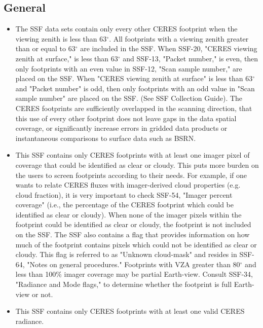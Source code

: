 \documentclass[12pt]{article}
\begin{document}
\subsection{General}\label{general}
\begin{itemize}
	\item The SSF data sets contain only every other CERES footprint when the viewing zenith is 		less than 63$^{\circ}$. All footprints with a viewing zenith greater than or equal to 63$^{\circ}$ 		are included in the SSF. When SSF-20, "CERES viewing zenith at surface," is less than 			63$^{\circ}$ and SSF-13, "Packet number," is even, then only footprints with an even value in 		SSF-12, "Scan sample number," are placed on the SSF. When "CERES viewing zenith at 			surface" is less than 63$^{\circ}$ and "Packet number" is odd, then only footprints with an odd 		value in "Scan sample number" are placed on the SSF. (See SSF Collection Guide). The 			CERES footprints are sufficiently overlapped in the scanning direction, that this use of every 		other footprint does not leave gaps in the data spatial coverage, or significantly increase errors 		in gridded data products or instantaneous comparisons to surface data such as BSRN. 
	
	\item This SSF contains only CERES footprints with at least one imager pixel of coverage that 		could be identified as clear or cloudy. This puts more burden on the users to screen footprints 		according to their needs. For example, if one wants to relate CERES fluxes with imager-derived 	cloud properties (e.g. cloud fraction), it is very important to check SSF-54, "Imager percent 		coverage" (i.e., the percentage of the CERES footprint which could be identified as clear or 		cloudy). When none of the imager pixels within the footprint could be identified as clear or 		cloudy, the footprint is not included on the SSF. The SSF also contains a flag that provides 		information on how much of the footprint contains pixels which could not be identified as clear 		or cloudy. This flag is referred to as "Unknown cloud-mask" and resides in SSF-64, "Notes on 		general procedures." Footprints with VZA greater than 80$^{\circ}$ and less than 100\% imager 	coverage may be partial Earth-view. Consult SSF-34, "Radiance and Mode flags," to determine 	whether the footprint is full Earth-view or not. 
	
	\item This SSF contains only CERES footprints with at least one valid CERES radiance.
	

\end{itemize}
\end{document}
